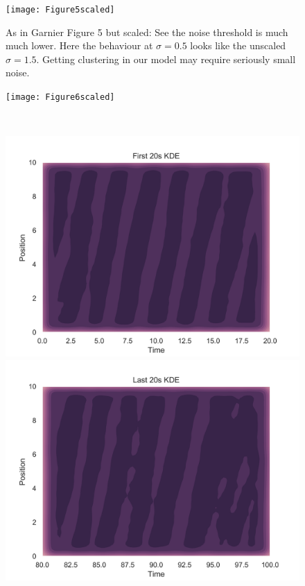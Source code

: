 \documentclass[11pt,a4paper, final, dvipsnames]{article}
\begin{document}
\begin{figure}
    \centering
    \texttt{[image: Figure5scaled]}
    \caption{As in Garnier Figure 5 but scaled: See the noise threshold is much much lower. Here the behaviour at $\sigma=0.5$ looks like the unscaled $\sigma=1.5$. Getting clustering in our model may require seriously small noise.}
\end{figure}
    \begin{figure}
    \centering
    \begin{minipage}[b]{\textwidth}
        \centering
        
        \texttt{[image: Figure6scaled]}
    \end{minipage} \\
    
    \begin{minipage}[b]{0.49\textwidth}
        \centering
        \includegraphics[width=\textwidth]{Figure6bscaled}
    \end{minipage} %
    \begin{minipage}[b]{0.49\textwidth}
        \centering                    
        \includegraphics[width=\textwidth]{Figure6dscaled}

\end{minipage}
\end{figure}
\end{document}
